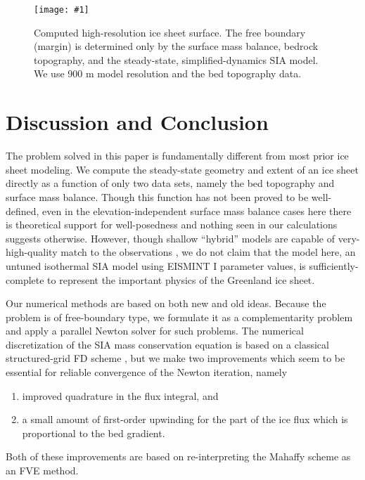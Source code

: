 \documentclass[twocolumn,a4paper]{igs}
\newcommand{\onecol}[1]{\texttt{[image: \#1]}}
\begin{document}
\begin{figure}[ht]
\onecol{grnwinset.pdf}
\caption{Computed high-resolution ice sheet surface.  The free boundary (margin) is determined only by the surface mass balance, bedrock topography, and the steady-state, simplified-dynamics SIA model.  We use 900 m model resolution and the \MCB bed topography data.}
\label{fig:grnwinset}
\end{figure}


\section{Discussion and Conclusion}

The problem solved in this paper is fundamentally different from most prior ice sheet modeling.  We compute the steady-state geometry and extent of an ice sheet directly as a function of only two data sets, namely the bed topography and surface mass balance.  Though this function has not been proved to be well-defined, even in the elevation-independent surface mass balance cases here \citep[compare][]{Jouvetetal2011} there is theoretical support for well-posedness \citep{JouvetBueler2012} and nothing seen in our calculations suggests otherwise.  However, though shallow ``hybrid'' models are capable of very-high-quality match to the observations \citep{Aschwandenetal2015}, we do not claim that the model here, an untuned isothermal SIA model using EISMINT I parameter values, is sufficiently-complete to represent the important physics of the Greenland ice sheet.

Our numerical methods are based on both new and old ideas.  Because the problem is of free-boundary type, we formulate it as a complementarity problem and apply a parallel Newton solver for such problems.  The numerical discretization of the SIA mass conservation equation is based on a classical structured-grid FD scheme \citep{Mahaffy1976}, but we make two improvements which seem to be essential for reliable convergence of the Newton iteration, namely
\renewcommand{\labelenumi}{\emph{(\roman{enumi})}}
\begin{enumerate}
\item improved quadrature in the flux integral, and
\item a small amount of first-order upwinding for the part of the ice flux which is proportional to the bed gradient.
\end{enumerate}
Both of these improvements are based on re-interpreting the Mahaffy scheme as an FVE method.
\end{document}
